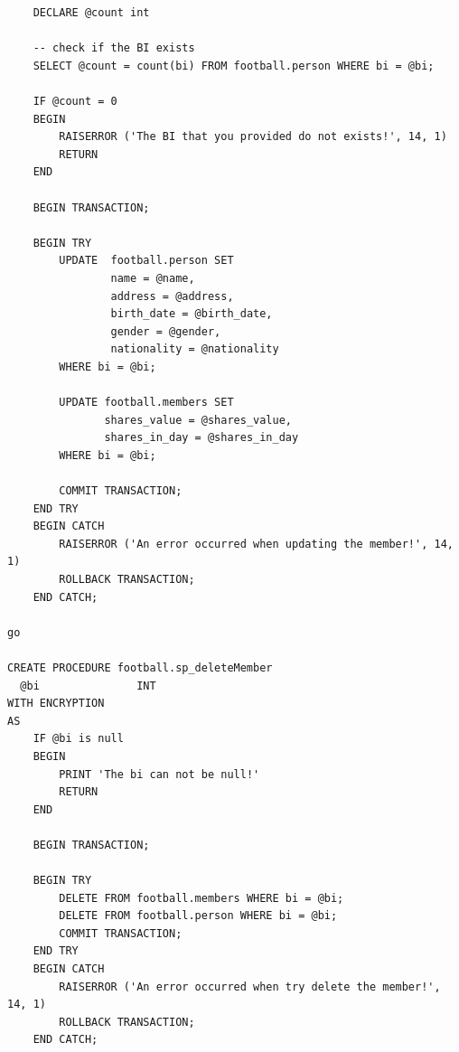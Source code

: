 \documentclass[pdftex,12pt,a4paper]{report}
\begin{document}
\begin{lstlisting}
	DECLARE @count int

	-- check if the BI exists
	SELECT @count = count(bi) FROM football.person WHERE bi = @bi;

	IF @count = 0
	BEGIN
		RAISERROR ('The BI that you provided do not exists!', 14, 1)
		RETURN
	END

	BEGIN TRANSACTION;

	BEGIN TRY
		UPDATE  football.person SET
				name = @name, 
				address = @address, 
				birth_date = @birth_date,
				gender = @gender,
				nationality = @nationality
		WHERE bi = @bi;

		UPDATE football.members SET
			   shares_value = @shares_value, 
			   shares_in_day = @shares_in_day	   
		WHERE bi = @bi;

		COMMIT TRANSACTION;
	END TRY
	BEGIN CATCH
		RAISERROR ('An error occurred when updating the member!', 14, 1)
		ROLLBACK TRANSACTION;
	END CATCH;

go

CREATE PROCEDURE football.sp_deleteMember
  @bi				INT
WITH ENCRYPTION
AS 
	IF @bi is null
	BEGIN
		PRINT 'The bi can not be null!'
		RETURN
	END
	
	BEGIN TRANSACTION;

	BEGIN TRY
		DELETE FROM football.members WHERE bi = @bi;
		DELETE FROM football.person WHERE bi = @bi;
		COMMIT TRANSACTION;
	END TRY
	BEGIN CATCH
		RAISERROR ('An error occurred when try delete the member!', 14, 1)
		ROLLBACK TRANSACTION;
	END CATCH;
\end{lstlisting}
\end{document}
